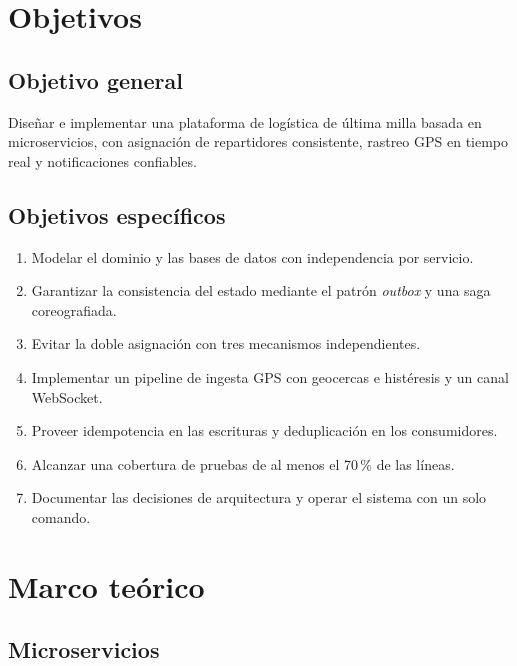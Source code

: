 \documentclass[10pt,letterpaper,twocolumn,oneside]{report}
\begin{document}
\chapter{Objetivos}

\section{Objetivo general}

Diseñar e implementar una plataforma de logística de última milla basada en microservicios, con
asignación de repartidores consistente, rastreo GPS en tiempo real y notificaciones confiables.

\section{Objetivos específicos}

\begin{enumerate}[leftmargin=1.2cm]
  \item Modelar el dominio y las bases de datos con independencia por servicio.
  \item Garantizar la consistencia del estado mediante el patrón \emph{outbox} y una saga
        coreografiada.
  \item Evitar la doble asignación con tres mecanismos independientes.
  \item Implementar un pipeline de ingesta GPS con geocercas e histéresis y un canal WebSocket.
  \item Proveer idempotencia en las escrituras y deduplicación en los consumidores.
  \item Alcanzar una cobertura de pruebas de al menos el 70\,\% de las líneas.
  \item Documentar las decisiones de arquitectura y operar el sistema con un solo comando.
\end{enumerate}

\chapter{Marco teórico}

\section{Microservicios}
\end{document}
